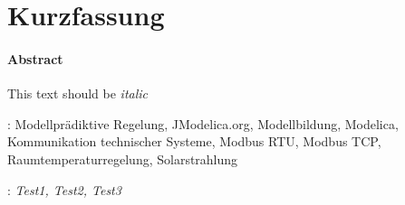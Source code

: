%
%

\chapter*{Kurzfassung}
\thispagestyle{empty}

\subsubsection*{Abstract}
This text should be \textit{italic}
\vspace{8\baselineskip}

{\normalsize
{}:  Modellprädiktive Regelung, JModelica.org, Modellbildung, Modelica, Kommunikation technischer Systeme, Modbus RTU, Modbus TCP, Raumtemperaturregelung, Solarstrahlung

:  \textit{Test1, Test2, Test3}
}

